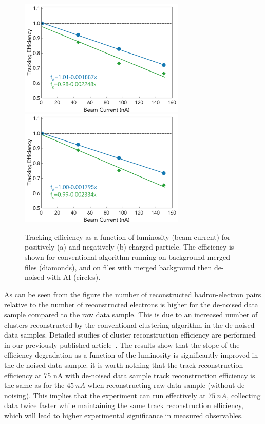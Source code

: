 \begin{figure}[!h]
\begin{center}
 \includegraphics[width=3.1in]{images/figure_lscan_pos.pdf}
 \includegraphics[width=3.1in]{images/figure_lscan_neg.pdf}
\caption {Tracking efficiency as a function of luminosity (beam current) for positively (a) and negatively (b) charged particle.  The efficiency is shown for
conventional algorithm running on background merged files (diamonds), and on files with merged background then de-noised with AI (circles).}
 \label{lscan::conv_dn}
 \end{center}
\end{figure}

As can be seen from the figure the number of reconstructed hadron-electron pairs relative to the number of reconstructed electrons is higher for the de-noised data sample compared to the raw data sample. This is due to an increased number of clusters reconstructed by the conventional clustering algorithm in the de-noised data samples. Detailed studies of cluster reconstruction efficiency are performed 
in our previously published article~\cite{Thomadakis:2022zcd}. 
The results show that the slope of the efficiency degradation as a function of the luminosity is significantly improved in the de-noised data sample. 
it is worth nothing that the track reconstruction efficiency at 75 nA with de-noised data sample track reconstruction efficiency is the same as for the 
$45~nA$ when reconstructing raw data sample (without de-noising). This implies that the experiment can run effectively at $75~nA$, collecting data 
twice faster while maintaining the same track reconstruction efficiency, which will lead to higher experimental significance in measured observables. 


